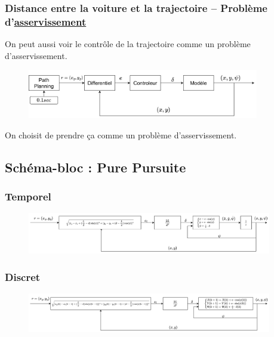 \documentclass[a4paper,12pt]{extarticle}
\begin{document}
\pagebreak

\subsubsection{Distance entre la voiture et la trajectoire – Problème d’\underline{asservissement}}
On peut aussi voir le contrôle  de la trajectoire comme un problème d'asservissement.

\begin{figure}[h!]
    \centering
    \includegraphics[width=0.9\textwidth]{image/asservissement.png}\\
\end{figure}

On choisit de prendre ça comme un problème d'asservissement.

\subsection{Schéma-bloc : Pure Pursuite}

\subsubsection{Temporel}

\begin{figure}[h!]
    \centering
    \includegraphics[width=0.95\textwidth]{image/PP_temps.png}\\
\end{figure}

\subsubsection{Discret}

\begin{figure}[h!]
    \centering
    \includegraphics[width=0.95\textwidth]{image/PP_discret.png}\\
\end{figure}
\end{document}
